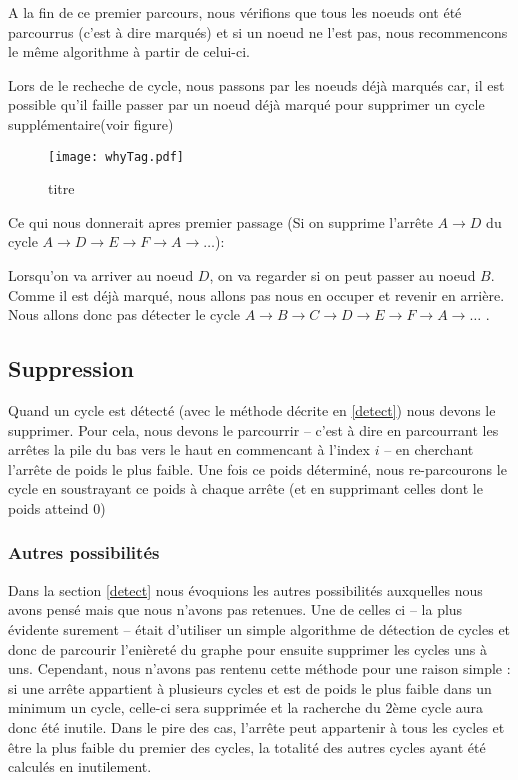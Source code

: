 \documentclass[12pt, oneside]{article}
\begin{document}
A la fin de ce premier parcours, nous vérifions que tous les noeuds ont été parcourrus (c'est à dire marqués) et si un noeud ne l'est pas, nous recommencons le même algorithme à partir de celui-ci.

Lors de le recheche de cycle, nous passons par les noeuds déjà marqués car, il est possible qu'il faille passer par un noeud déjà marqué pour supprimer un cycle supplémentaire(voir figure)

\begin{figure}[h]
   \caption{\label{etiquette} titre}
   \texttt{[image: whyTag.pdf]}
\end{figure}

Ce qui nous donnerait apres premier passage (Si on supprime l'arrête $A \rightarrow D$ du cycle $A \rightarrow D \rightarrow E \rightarrow F \rightarrow A \rightarrow\ldots$):

Lorsqu'on va arriver au noeud $D$, on va regarder si on peut passer au noeud $B$. Comme il est déjà marqué, nous allons pas nous en occuper et revenir en arrière. Nous allons donc pas détecter le cycle $A \rightarrow B \rightarrow C \rightarrow D \rightarrow E \rightarrow F \rightarrow A \rightarrow\ldots$  .

\subsection{Suppression}
\label{del}

Quand un cycle est détecté (avec le méthode décrite en \ref{detect}) nous devons le supprimer. Pour cela, nous devons le parcourrir -- c'est à dire en parcourrant les arrêtes la pile du bas vers le haut en commencant à l'index $i$ -- en cherchant l'arrête de poids le plus faible. Une fois ce poids déterminé, nous re-parcourons le cycle en soustrayant ce poids à chaque arrête (et en supprimant celles dont le poids atteind 0)



\subsubsection{Autres possibilités}
\label{others}

Dans la section \ref{detect} nous évoquions les autres possibilités auxquelles nous avons pensé mais que nous n'avons pas retenues. Une de celles ci -- la plus évidente surement -- était d'utiliser un simple algorithme de détection de cycles et donc de parcourir l'enièreté du graphe pour ensuite supprimer les cycles uns à uns. Cependant, nous n'avons pas rentenu cette méthode pour une raison simple : si une arrête appartient à plusieurs cycles et est de poids le plus faible dans un minimum un cycle, celle-ci sera supprimée et la racherche du 2ème cycle aura donc été inutile. Dans le pire des cas, l'arrête peut appartenir à tous les cycles et être la plus faible du premier des cycles, la totalité des autres cycles ayant été calculés en inutilement.
\end{document}
